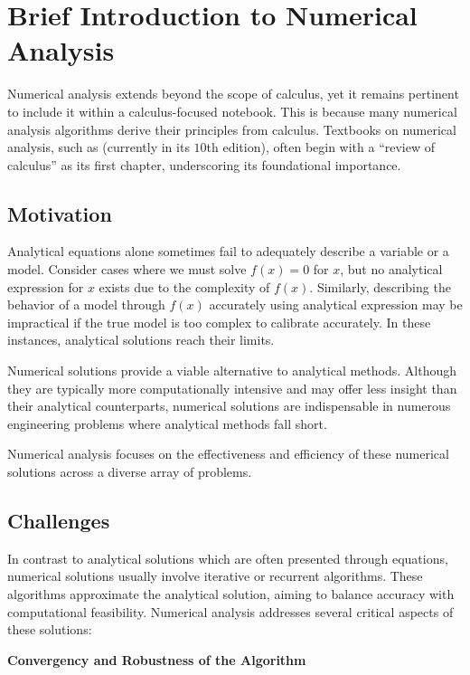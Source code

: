 \chapter{Brief Introduction to Numerical Analysis}

Numerical analysis extends beyond the scope of calculus, yet it remains pertinent to include it within a calculus-focused notebook. This is because many numerical analysis algorithms derive their principles from calculus. Textbooks on numerical analysis, such as \cite{burden1997numerical} (currently in its $10$th edition), often begin with a ``review of calculus'' as its first chapter, underscoring its foundational importance.

\section{Motivation}

Analytical equations alone sometimes fail to adequately describe a variable or a model. Consider cases where we must solve $f(x) = 0$ for $x$, but no analytical expression for $x$ exists due to the complexity of $f(x)$. Similarly, describing the behavior of a model through $f(x)$ accurately using analytical expression may be impractical if the true model is too complex to calibrate accurately. In these instances, analytical solutions reach their limits.

Numerical solutions provide a viable alternative to analytical methods. Although they are typically more computationally intensive and may offer less insight than their analytical counterparts, numerical solutions are indispensable in numerous engineering problems where analytical methods fall short.

Numerical analysis focuses on the effectiveness and efficiency of these numerical solutions across a diverse array of problems.

\section{Challenges}

In contrast to analytical solutions which are often presented through equations, numerical solutions usually involve iterative or recurrent algorithms. These algorithms approximate the analytical solution, aiming to balance accuracy with computational feasibility. Numerical analysis addresses several critical aspects of these solutions:

\vspace{0.1in}
\noindent \textbf{Convergency and Robustness of the Algorithm}
\vspace{0.1in}

